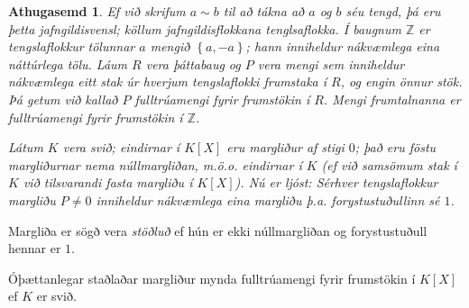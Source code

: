 \documentclass[a4paper,icelandic,11pt]{book}
\theoremstyle{plain}
\newtheorem*{ath}{Athugasemd}
\newcommand{\Z}{\mathbb{Z}}
\begin{document}
\begin{ath}
  Ef við skrifum $a\sim b$ til að tákna að $a$ og $b$ séu tengd, þá eru þetta
  jafngildisvensl; köllum jafngildisflokkana
  \emph{tenglsaflokka}. Í baugnum $\Z$ er tengslaflokkur
  tölunnar $a$ mengið $\left\{ a,-a \right\}$; hann inniheldur nákvæmlega eina
  náttúrlega tölu. Láum $R$ vera þáttabaug og $P$ vera mengi sem inniheldur
  nákvæmlega eitt stak úr hverjum tengslaflokki \emph{frumstaka} í $R$, og engin
  önnur stök. Þá getum við kallað $P$ \emph{fulltrúamengi fyrir
  frumstökin} í $R$. Mengi
  frumtalnanna er fulltrúamengi fyrir frumstökin í $\Z$. 
  
  Látum $K$ vera svið; eindirnar í $K[X]$ eru margliður af stigi $0$; það eru
  föstu margliðurnar nema núllmargliðan, m.ö.o. eindirnar í $K$ (ef við samsömum
  stak í $K$ við tilsvarandi fasta margliðu í $K[X]$). Nú er ljóst: Sérhver
  tengslaflokkur margliðu $P\neq 0$ inniheldur nákvæmlega eina margliðu þ.a.
  forystustuðullinn sé $1$.
\end{ath}
\begin{skilgr}
  Margliða er sögð vera \emph{stöðluð} ef hún er ekki núllmargliðan og
  forystustuðull hennar er $1$.
\end{skilgr}
Óþættanlegar staðlaðar margliður mynda fulltrúamengi fyrir frumstökin í
$K[X]$ ef $K$ er svið.
\end{document}
